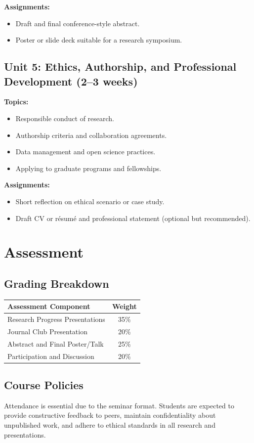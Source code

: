\documentclass[12pt,oneside]{book}
\begin{document}
\textbf{Assignments:}
\begin{itemize}
    \item Draft and final conference-style abstract.
    \item Poster or slide deck suitable for a research symposium.
\end{itemize}

\subsection{Unit 5: Ethics, Authorship, and Professional Development (2--3 weeks)}

\textbf{Topics:}
\begin{itemize}
    \item Responsible conduct of research.
    \item Authorship criteria and collaboration agreements.
    \item Data management and open science practices.
    \item Applying to graduate programs and fellowships.
\end{itemize}

\textbf{Assignments:}
\begin{itemize}
    \item Short reflection on ethical scenario or case study.
    \item Draft CV or résumé and professional statement (optional but recommended).
\end{itemize}

\section{Assessment}

\subsection{Grading Breakdown}

\begin{table}[h]
\centering
\begin{tabular}{lc}
\toprule
\textbf{Assessment Component} & \textbf{Weight} \\
\midrule
Research Progress Presentations & 35\% \\
Journal Club Presentation & 20\% \\
Abstract and Final Poster/Talk & 25\% \\
Participation and Discussion & 20\% \\
\bottomrule
\end{tabular}
\end{table}

\subsection{Course Policies}

Attendance is essential due to the seminar format. Students are expected to provide constructive feedback to peers, maintain confidentiality about unpublished work, and adhere to ethical standards in all research and presentations.
\end{document}
